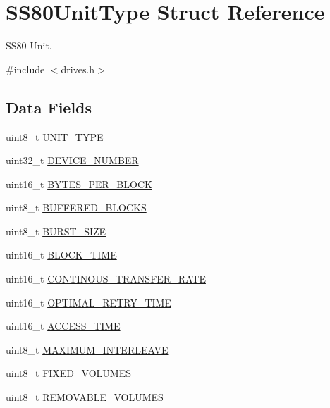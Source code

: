 \hypertarget{structSS80UnitType}{}\section{S\+S80\+Unit\+Type Struct Reference}
\label{structSS80UnitType}


S\+S80 Unit.  




{\ttfamily \#include $<$drives.\+h$>$}

\subsection*{Data Fields}
\begin{DoxyCompactItemize}
\item 
uint8\+\_\+t \hyperlink{structSS80UnitType_ae00e42430682e849d83b1ca4c8f44013}{U\+N\+I\+T\+\_\+\+T\+Y\+PE}
\item 
uint32\+\_\+t \hyperlink{structSS80UnitType_a69cad18aab93449fbd91445c4ba62928}{D\+E\+V\+I\+C\+E\+\_\+\+N\+U\+M\+B\+ER}
\item 
uint16\+\_\+t \hyperlink{structSS80UnitType_a18a5f03be6bea14c6c4a1f9b952bb160}{B\+Y\+T\+E\+S\+\_\+\+P\+E\+R\+\_\+\+B\+L\+O\+CK}
\item 
uint8\+\_\+t \hyperlink{structSS80UnitType_a575a381fe873ba8ba9aa4630673516a4}{B\+U\+F\+F\+E\+R\+E\+D\+\_\+\+B\+L\+O\+C\+KS}
\item 
uint8\+\_\+t \hyperlink{structSS80UnitType_a4bc66bc02c06dbfe279be6d2af808a04}{B\+U\+R\+S\+T\+\_\+\+S\+I\+ZE}
\item 
uint16\+\_\+t \hyperlink{structSS80UnitType_ab94c4b75c74e08e128d4802f5dec0dd5}{B\+L\+O\+C\+K\+\_\+\+T\+I\+ME}
\item 
uint16\+\_\+t \hyperlink{structSS80UnitType_a0486673977da185f2f69aaff378f81a2}{C\+O\+N\+T\+I\+N\+O\+U\+S\+\_\+\+T\+R\+A\+N\+S\+F\+E\+R\+\_\+\+R\+A\+TE}
\item 
uint16\+\_\+t \hyperlink{structSS80UnitType_ab7ae848f0a65aa2e29b613bc110c9085}{O\+P\+T\+I\+M\+A\+L\+\_\+\+R\+E\+T\+R\+Y\+\_\+\+T\+I\+ME}
\item 
uint16\+\_\+t \hyperlink{structSS80UnitType_ab43ef110f145d428fff831afc18f5e24}{A\+C\+C\+E\+S\+S\+\_\+\+T\+I\+ME}
\item 
uint8\+\_\+t \hyperlink{structSS80UnitType_ab215c7a9a84d0d5003a2dcfbd18e4b7d}{M\+A\+X\+I\+M\+U\+M\+\_\+\+I\+N\+T\+E\+R\+L\+E\+A\+VE}
\item 
uint8\+\_\+t \hyperlink{structSS80UnitType_ae1d52bfc5a9bdb8f6f26ba6dffd7c2f6}{F\+I\+X\+E\+D\+\_\+\+V\+O\+L\+U\+M\+ES}
\item 
uint8\+\_\+t \hyperlink{structSS80UnitType_a6dcef2939bd0a19951ad1592b1ec8c31}{R\+E\+M\+O\+V\+A\+B\+L\+E\+\_\+\+V\+O\+L\+U\+M\+ES}
\end{DoxyCompactItemize}


